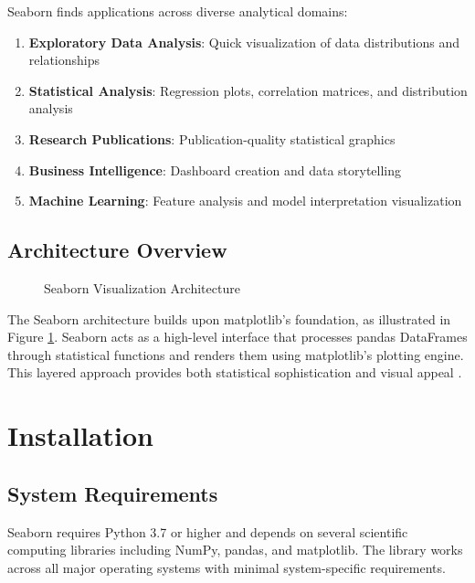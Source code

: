 Seaborn finds applications across diverse analytical domains:

\begin{enumerate}
	\item \textbf{Exploratory Data Analysis}: Quick visualization of data distributions and relationships
	\item \textbf{Statistical Analysis}: Regression plots, correlation matrices, and distribution analysis
	\item \textbf{Research Publications}: Publication-quality statistical graphics
	\item \textbf{Business Intelligence}: Dashboard creation and data storytelling
	\item \textbf{Machine Learning}: Feature analysis and model interpretation visualization
\end{enumerate}

\subsection{Architecture Overview}
\label{subsec:architecture}

\begin{figure}[H]
	\centering
	
	\caption{Seaborn Visualization Architecture \cite{Seaborn:2024}}
	\label{fig:seaborn_architecture}
\end{figure}

The Seaborn architecture builds upon matplotlib's foundation, as illustrated in Figure \ref{fig:seaborn_architecture}. Seaborn acts as a high-level interface that processes pandas DataFrames through statistical functions and renders them using matplotlib's plotting engine. This layered approach provides both statistical sophistication and visual appeal \cite{Waskom:2021}.

\clearpage

\section{Installation}
\label{sec:installation}

\subsection{System Requirements}
\label{subsec:system_requirements}

Seaborn requires Python 3.7 or higher and depends on several scientific computing libraries including NumPy, pandas, and matplotlib. The library works across all major operating systems with minimal system-specific requirements.

